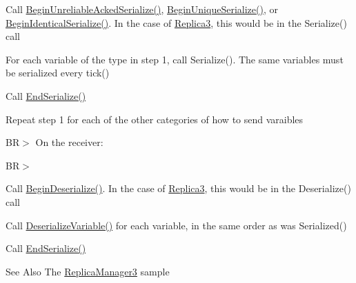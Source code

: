 \begin{DoxyEnumerate}
\item Call \hyperlink{class_rak_net_1_1_variable_delta_serializer_ae755cec2f8482621b134f1537a818d98}{Begin\-Unreliable\-Acked\-Serialize()}, \hyperlink{class_rak_net_1_1_variable_delta_serializer_ad3c9911d1d42bd432d622c98097f14a3}{Begin\-Unique\-Serialize()}, or \hyperlink{class_rak_net_1_1_variable_delta_serializer_a3ba21dc59bc10fa337c02d79a785e344}{Begin\-Identical\-Serialize()}. In the case of \hyperlink{class_rak_net_1_1_replica3}{Replica3}, this would be in the Serialize() call\par

\item For each variable of the type in step 1, call Serialize(). The same variables must be serialized every tick()\par

\item Call \hyperlink{class_rak_net_1_1_variable_delta_serializer_a08a27cab67d35fd2fa80fefcc6a0ff13}{End\-Serialize()}\par

\item Repeat step 1 for each of the other categories of how to send varaibles\par
 B\-R$>$ On the receiver\-:\par
 B\-R$>$
\end{DoxyEnumerate}
\begin{DoxyEnumerate}
\item Call \hyperlink{class_rak_net_1_1_variable_delta_serializer_a5cea057c2704378cc1268af235ff7b1e}{Begin\-Deserialize()}. In the case of \hyperlink{class_rak_net_1_1_replica3}{Replica3}, this would be in the Deserialize() call\par

\item Call \hyperlink{class_rak_net_1_1_variable_delta_serializer_ac7784665aecbdb82c929878c8a5a3007}{Deserialize\-Variable()} for each variable, in the same order as was Serialized()\par

\item Call \hyperlink{class_rak_net_1_1_variable_delta_serializer_a08a27cab67d35fd2fa80fefcc6a0ff13}{End\-Serialize()}\par
 \begin{DoxySeeAlso}{See Also}
The \hyperlink{class_rak_net_1_1_replica_manager3}{Replica\-Manager3} sample 
\end{DoxySeeAlso}

\end{DoxyEnumerate}

